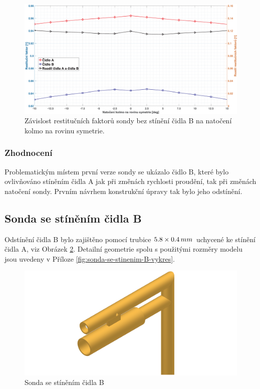              \begin{figure}[ht!]
                \centering
                \includegraphics*[width=\textwidth]{400_SIMULACE_KONSTRUKCNICH_UPRAV/Grafy/01_kolma_rovina}
                \caption{Závislost restitučních faktorů sondy bez stínění čidla B na natočení kolmo na rovinu symetrie.}
                \label{fig:sonda-bez-stineni-kolma-rovina}
            \end{figure}

        \subsubsection{Zhodnocení}
            Problematickým místem první verze sondy se ukázalo čidlo B, které bylo ovlivňováno stíněním čidla A jak při změnách rychlosti proudění, tak při změnách natočení sondy. Prvním návrhem konstrukční úpravy tak bylo jeho odstínění.
    \newpage
    \subsection{Sonda se stíněním čidla B} \label{sec:sonda-se-stinenim-B}
        Odstínění čidla B bylo zajištěno pomocí trubice $5.8 \times 0.4 \, mm$ uchycené ke stínění čidla A, viz Obrázek \ref{fig:sonda-se-stinenim-B}. Detailní geometrie spolu s použitými rozměry modelu jsou uvedeny v Příloze \ref{fig:sonda-se-stinenim-B-vykres}. 
        
        \begin{figure}[ht!]
            \centering
            \includegraphics[width=\textwidth]{400_SIMULACE_KONSTRUKCNICH_UPRAV/Vykresy_rendery/Sonda_se_stinenim_B.png}
            \caption{Sonda se stíněním čidla B}
            \label{fig:sonda-se-stinenim-B}
        \end{figure}

